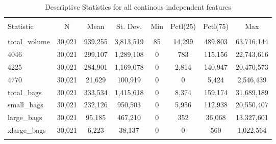 \documentclass[11pt]{article}\usepackage[]{graphicx}\usepackage[]{color}
\begin{document}
\begin{center}

\begin{table}[H] \centering 
  \caption{Descriptive Statistics for all continous independent features} 
  \label{desc_stat_ind} 
\begin{tabular}{@{\extracolsep{5pt}}lccccccc} 
\\[-1.8ex]\hline 
\hline \\[-1.8ex] 
Statistic & \multicolumn{1}{c}{N} & \multicolumn{1}{c}{Mean} & \multicolumn{1}{c}{St. Dev.} & \multicolumn{1}{c}{Min} & \multicolumn{1}{c}{Pctl(25)} & \multicolumn{1}{c}{Pctl(75)} & \multicolumn{1}{c}{Max} \\ 
\hline \\[-1.8ex] 
total\_volume & 30,021 & 939,255 & 3,813,519 & 85 & 14,299 & 489,803 & 63,716,144 \\ 
4046 & 30,021 & 299,107 & 1,289,108 & 0 & 783 & 115,156 & 22,743,616 \\ 
4225 & 30,021 & 284,901 & 1,169,078 & 0 & 2,814 & 140,947 & 20,470,573 \\ 
4770 & 30,021 & 21,629 & 100,919 & 0 & 0 & 5,424 & 2,546,439 \\ 
total\_bags & 30,021 & 333,534 & 1,415,618 & 0 & 8,374 & 159,174 & 31,689,189 \\ 
small\_bags & 30,021 & 232,126 & 950,503 & 0 & 5,956 & 112,938 & 20,550,407 \\ 
large\_bags & 30,021 & 95,185 & 467,210 & 0 & 352 & 36,068 & 13,327,601 \\ 
xlarge\_bags & 30,021 & 6,223 & 38,137 & 0 & 0 & 560 & 1,022,564 \\ 
\hline \\[-1.8ex] 
\end{tabular} 
\end{table} 

\end{center}
\end{document}
